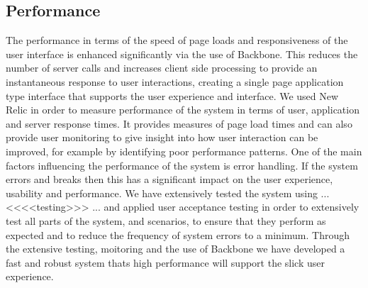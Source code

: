 \subsection{Performance}
The performance in terms of the speed of page loads and responsiveness of the user interface is enhanced significantly via the use of Backbone. This reduces the number of server calls and increases client side processing to provide an instantaneous response to user interactions, creating a single page application type interface that supports the user experience and interface. We used New Relic in order to measure performance of the system in terms of user, application and server response times. It provides measures of page load times and can also provide user monitoring to give insight into how user interaction can be improved, for example by identifying poor performance patterns.
One of the main factors influencing the performance of the system is error handling. If the system errors and breaks then this has a significant impact on the user experience, usability and performance. We have extensively tested the system using ... <<<<testing>>> ... and applied user acceptance testing in order to extensively test all parts of the system, and scenarios, to ensure that they perform as expected and to reduce the frequency of system errors to a minimum.
Through the extensive testing, moitoring and the use of Backbone we have developed a fast and robust system thats high performance will support the slick user experience.